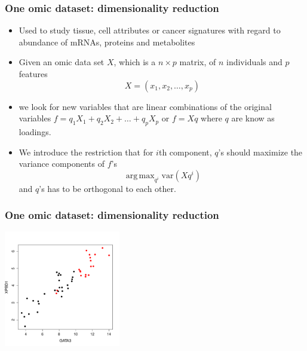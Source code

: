 \documentclass[10pt,xcolor=dvipsnames]{beamer}\usepackage[]{graphicx}\usepackage[]{color}
\newenvironment{knitrout}{}{} %
\DeclareMathOperator{\argmax}{arg\,max}
\begin{document}
\begin{frame}[fragile]\frametitle{One omic dataset: dimensionality reduction}

\begin{itemize}
\item Used to study tissue, cell attributes or cancer signatures with 
regard to abundance of mRNAs, proteins and metabolites
\item Given an omic data set $X$, which is a $n \times p$ matrix, of $n$ individuals and $p$ features
$$ X=(x_1, x_2, \ldots, x_p)$$ 
\item we look for new variables that are linear combinations of the original variables
$f=q_1X_1 + q_2X_2 + \ldots + q_pX_p$  or $f=Xq$ where $q$ are know as loadings.
\item We introduce the restriction that for $i$th component, $q$'s should maximize the variance components of $f$'s
$$ \argmax_{q^i} \text{var}(Xq^i)$$ and $q$'s has to be orthogonal to each other.
\end{itemize}

\end{frame}

\begin{frame}[fragile]\frametitle{One omic dataset: dimensionality reduction}

\begin{knitrout}\footnotesize
{}\color{fgcolor}

{\centering \includegraphics[width=2in]{figure/plot_pca_1-1} 

}



\end{knitrout}

\end{frame}
\end{document}
